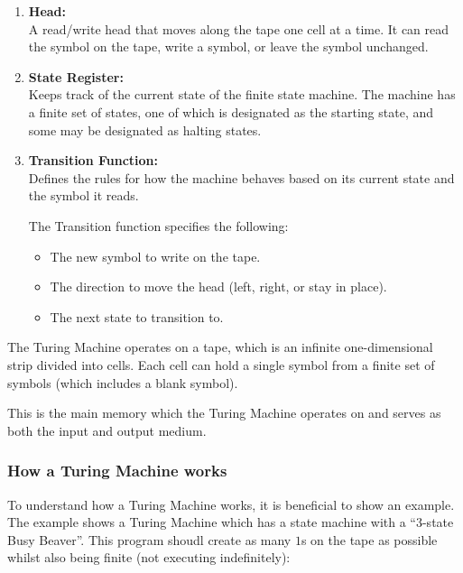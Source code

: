 \begin{enumerate}
    \item \textbf{Head:} \\
    A read/write head that moves along the tape one cell at a time.
    It can read the symbol on the tape, write a symbol, or leave the symbol unchanged.

    \item \textbf{State Register:} \\
    Keeps track of the current state of the finite state machine.
    The machine has a finite set of states, one of which is designated as the starting state, and some may be designated as halting states.

    \item \textbf{Transition Function:} \\
    Defines the rules for how the machine behaves based on its current state and the symbol it reads.

    The Transition function specifies the following:
    \begin{itemize}
        \item The new symbol to write on the tape.
        \item The direction to move the head (left, right, or stay in place).
        \item The next state to transition to.
    \end{itemize}
\end{enumerate}

The Turing Machine operates on a tape, which is an infinite one-dimensional strip divided into cells. 
Each cell can hold a single symbol from a finite set of symbols (which includes a blank symbol).

This is the main memory which the Turing Machine operates on and serves as both the input and output medium.

\newpage
\subsubsection{How a Turing Machine works}

To understand how a Turing Machine works, it is beneficial to show an example. The example shows a Turing Machine which has a state machine
with a ``3-state Busy Beaver''. This program shoudl create as many $1$s on the tape as possible whilst also being finite (not executing indefinitely):

